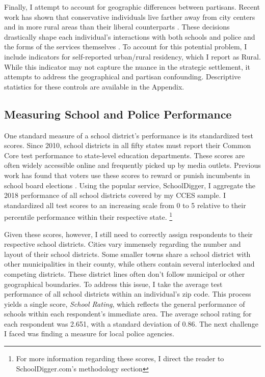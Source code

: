 Finally, I attempt to account for geographic differences between partisans. Recent work has shown that conservative individuals live farther away from city centers and in more rural areas than their liberal counterparts \citep{gimpelUrbanRuralGulf2020}. These decisions drastically shape each individual's interactions with both schools and police and the forms of the services themselves \citep{walshPuttingInequalityIts2012}. To account for this potential problem, I include indicators for self-reported urban/rural residency, which I report as Rural. While this indicator may not capture the nuance in the strategic settlement, it attempts to address the geographical and partisan confounding. Descriptive statistics for these controls are available in the Appendix. 

\subsection{Measuring School and Police Performance}
One standard measure of a school district's performance is its standardized test scores. Since 2010, school districts in all fifty states must report their Common Core test performance to state-level education departments. These scores are often widely accessible online and frequently picked up by media outlets. Previous work has found that voters use these scores to reward or punish incumbents in school board elections \citep{berryAccountabilityLocalElections2007,paysonWhenAreLocal2017}. Using the popular service, SchoolDigger, I aggregate the 2018 performance of all school districts covered by my CCES sample. I standardized all test scores to an increasing scale from 0 to 5 relative to their percentile performance within their respective state. \footnote{For more information regarding these scores, I direct the reader to SchoolDigger.com's methodology section} 

Given these scores, however, I still need to correctly assign respondents to their respective school districts. Cities vary immensely regarding the number and layout of their school districts. Some smaller towns share a school district with other municipalities in their county, while others contain several interlocked and competing districts. These district lines often don't follow municipal or other geographical boundaries. To address this issue, I take the average test performance of all school districts within an individual's zip code. This process yields a single score, \textit{School Rating}, which reflects the general performance of schools within each respondent's immediate area. The average school rating for each respondent was 2.651, with a standard deviation of 0.86. The next challenge I faced was finding a measure for local police agencies. 

